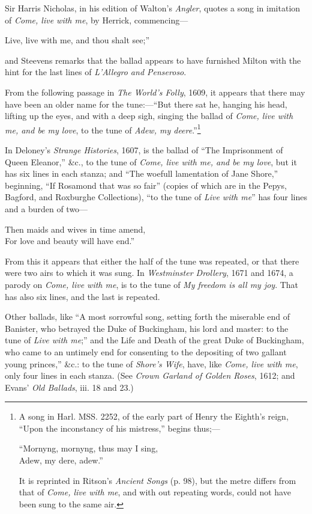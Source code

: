 Sir Harris Nicholas, in his edition of Walton’s \textit{Angler}, quotes a song in imitation
of \textit{Come, live with me}, by Herrick, commencing—
\begin{scverse}
Live, live with me, and thou shalt see;”
\end{scverse}
and Steevens remarks that the ballad appears to have furnished Milton with the
hint for the last lines of \textit{L’Allegro and Penseroso}.

From the following passage in \textit{The World’s Folly}, 1609, it appears that there
may have been an older name for the tune:—“But there sat he, hanging his
head, lifting up the eyes, and with a deep sigh, singing the ballad of \textit{Come, live
with me, and be my love}, to the tune of \textit{Adew, my deere}.”\footnote{\textit{}
A song in Harl. MSS. 2252, of the early part of Henry
the Eighth’s reign, “Upon the inconstancy of his mistress,” begins thus;—
\settowidth{\versewidth}{Mornyng, mornyng, thus may I sing,}
\begin{fnverse}
“Mornyng, mornyng, thus may I sing, \\
\vin\vin Adew, my dere, adew.”
\end{fnverse}
It is reprinted in Ritson's \textit{Ancient Songs} (p. 98), but the
metre differs from that of \textit{Come, live with me}, and with
out repeating words, could not have been sung to	the
same air.
}

In Deloney’s \textit{Strange Histories}, 1607, is the ballad of “The Imprisonment of 
Queen Eleanor,” \&c., to the tune of \pagebreak \textit{Come, live with me, and be my love}, but it has
six lines in each stanza; and “The woefull lamentation of Jane Shore,” beginning,
“If Rosamond that was so fair” (copies of which are in the Pepys, Bagford, and
Roxburghe Collections), “to the tune of \textit{Live with me}” has four lines and a
burden of two— 
\settowidth{\versewidth}{Then maids and wives in time amend,}
\begin{scverse}
Then maids and wives in time amend,\\
For love and beauty will have end.”
\end{scverse}
From this it appears that either the half of the tune was repeated, or that there
were two airs to which it was sung. In \textit{Westminster Drollery}, 1671 and 1674, a
parody on \textit{Come, live with me}, is to the tune of \textit{My freedom is all my joy}. That
has also six lines, and the last is repeated.

Other ballads, like “A most sorrowful song, setting forth the miserable end of
Banister, who betrayed the Duke of Buckingham, his lord and master: to the tune
of \textit{Live with me};” and the Life and Death of the great Duke of Buckingham, who
came to an untimely end for consenting to the depositing of two gallant young
princes,” \&c.: to the tune of \textit{Shore’s Wife}, have, like \textit{Come, live with me}, only
four lines in each stanza. (See \textit{Crown Garland of Golden Roses}, 1612; and
Evans’ \textit{Old Ballads}, iii. 18 and 23.)

